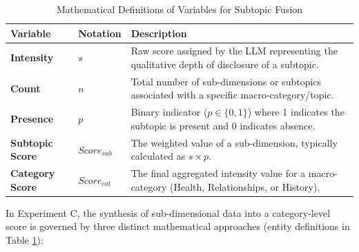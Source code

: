 \begin{table}[htbp]
\centering
\caption{Mathematical Definitions of Variables for Subtopic Fusion}
\label{tab:variable_definitions}
\begin{tabular}{@{}llp{8cm}@{}}
\toprule
\textbf{Variable} & \textbf{Notation} & \textbf{Description} \\ \midrule
\textbf{Intensity} & $s$ & Raw score assigned by the LLM representing the qualitative depth of disclosure of a subtopic. \\
\textbf{Count}     & $n$ & Total number of sub-dimensions or subtopics associated with a specific macro-category/topic. \\
\textbf{Presence}  & $p$ & Binary indicator ($p \in \{0, 1\}$) where 1 indicates the subtopic is present and 0 indicates absence. \\
\textbf{Subtopic Score} & $Score_{sub}$ & The weighted value of a sub-dimension, typically calculated as $s \times p$. \\
\textbf{Category Score} & $Score_{cat}$ & The final aggregated intensity value for a macro-category (Health, Relationships, or History). \\ \bottomrule
\end{tabular}
\end{table}

In Experiment C, the synthesis of sub-dimensional data into a category-level score is governed by three distinct mathematical approaches (entity definitions in Table \ref{tab:variable_definitions}): 


